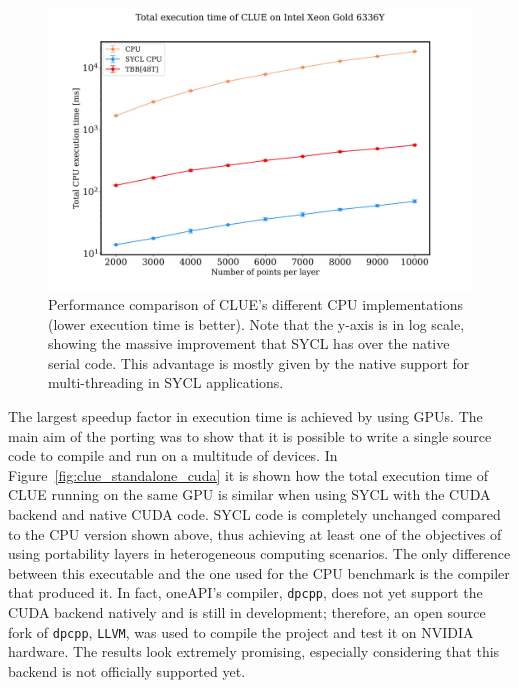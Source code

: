 \begin{figure}[H]
    \centering
    \includegraphics[width=\textwidth]{media/clue_standalone_cpu.png}
    \caption{Performance comparison of CLUE's different CPU implementations (lower execution time is better). Note that the y-axis is in log scale, showing the massive improvement that SYCL has over the native serial code. This advantage is mostly given by the native support for multi-threading in SYCL applications.}
    \label{fig:clue_standalone_cpu}
\end{figure}

The largest speedup factor in execution time is achieved by using GPUs. The main aim of the porting was to show that it is possible to write a single source code to compile and run on a multitude of devices. In Figure~\ref{fig:clue_standalone_cuda} it is shown how the total execution time of CLUE running on the same GPU is similar when using SYCL with the CUDA backend and native CUDA code. SYCL code is completely unchanged compared to the CPU version shown above, thus achieving at least one of the objectives of using portability layers in heterogeneous computing scenarios. The only difference between this executable and the one used for the CPU benchmark is the compiler that produced it. In fact, oneAPI's compiler, \texttt{dpcpp}, does not yet support the CUDA backend natively and is still in development; therefore, an open source fork of \texttt{dpcpp}, \texttt{LLVM}, was used to compile the project and test it on NVIDIA hardware. The results look extremely promising, especially considering that this backend is not officially supported yet.

